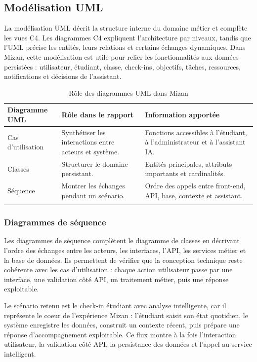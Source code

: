 \documentclass{rapportENSET}
\begin{document}
\subsection{Modélisation UML}
La modélisation UML décrit la structure interne du domaine métier et complète les vues C4. Les diagrammes C4 expliquent l'architecture par niveaux, tandis que l'UML précise les entités, leurs relations et certains échanges dynamiques. Dans Mizan, cette modélisation est utile pour relier les fonctionnalités aux données persistées : utilisateur, étudiant, classe, check-ins, objectifs, tâches, ressources, notifications et décisions de l'assistant.

\begin{longtable}{@{}L{0.27\textwidth}L{0.34\textwidth}L{0.29\textwidth}@{}}
\toprule
\textbf{Diagramme UML} & \textbf{Rôle dans le rapport} & \textbf{Information apportée} \\
\midrule
\endhead
Cas d'utilisation & Synthétiser les interactions entre acteurs et système. & Fonctions accessibles à l'étudiant, à l'administrateur et à l'assistant IA. \\
Classes & Structurer le domaine persistant. & Entités principales, attributs importants et cardinalités. \\
Séquence & Montrer les échanges pendant un scénario. & Ordre des appels entre front-end, API, base, contexte et assistant. \\
\bottomrule
\caption{Rôle des diagrammes UML dans Mizan}
\end{longtable}

\subsubsection{Diagrammes de séquence}
Les diagrammes de séquence complètent le diagramme de classes en décrivant l'ordre des échanges entre les acteurs, les interfaces, l'API, les services métier et la base de données. Ils permettent de vérifier que la conception technique reste cohérente avec les cas d'utilisation : chaque action utilisateur passe par une interface, une validation côté API, un traitement métier, puis une réponse exploitable.

Le scénario retenu est le check-in étudiant avec analyse intelligente, car il représente le coeur de l'expérience Mizan : l'étudiant saisit son état quotidien, le système enregistre les données, construit un contexte récent, puis prépare une réponse d'accompagnement exploitable. Ce flux montre à la fois l'interaction utilisateur, la validation côté API, la persistance des données et l'appel au service intelligent.
\end{document}
